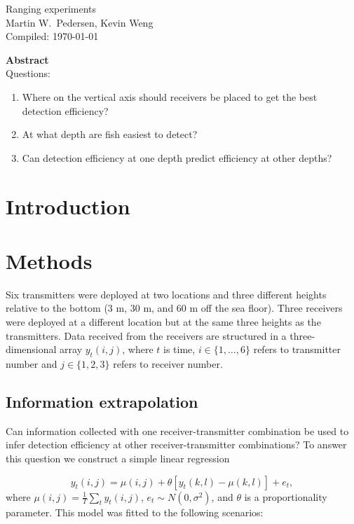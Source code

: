 \documentclass{article}
\begin{document}
\begin{center}
\Large Ranging experiments\\ \normalsize
Martin W.\ Pedersen, Kevin Weng\\
Compiled: \today  
\end{center}

\textbf{Abstract}\\
Questions: 
\begin{enumerate}
\item Where on the vertical axis should receivers be placed to get the best detection efficiency?
\item At what depth are fish easiest to detect?
\item Can detection efficiency at one depth predict efficiency at other depths?
\end{enumerate}

 
\newpage
\section{Introduction} \label{sec:introduction} 

\section{Methods}
\label{sec:methods}

Six transmitters were deployed at two locations and three different heights relative to the bottom (3 m, 30 m, and 60 m off the sea floor). Three receivers were deployed at a different location but at the same three heights as the transmitters. Data received from the receivers are structured in a three-dimensional array $y_t(i,j)$, where $t$ is time, $i\in \{1,\ldots,6\}$ refers to transmitter number and $j\in \{1,2,3\}$ refers to receiver number.

\subsection{Information extrapolation}

Can information collected with one receiver-transmitter combination be used to infer detection efficiency at other receiver-transmitter combinations? To answer this question we construct a simple linear regression

\begin{equation}
  y_t(i,j) = \mu(i,j) + \theta[y_t(k,l)-\mu(k,l)] + e_t,
\label{eq:eff1}
\end{equation}
where $\mu(i,j) = \frac{1}{T}\sum_t y_t(i,j)$, $e_t \sim N(0,\sigma^2)$, and $\theta$ is a proportionality parameter. This model was fitted to the following scenarios:
\end{document}
